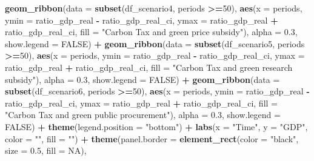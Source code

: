 \documentclass[
]{article}
\newenvironment{Shaded}{\begin{snugshade}}{\end{snugshade}}
\newcommand{\AttributeTok}[1]{\textcolor[rgb]{0.13,0.29,0.53}{#1}}
\newcommand{\ConstantTok}[1]{\textcolor[rgb]{0.56,0.35,0.01}{#1}}
\newcommand{\DecValTok}[1]{\textcolor[rgb]{0.00,0.00,0.81}{#1}}
\newcommand{\FloatTok}[1]{\textcolor[rgb]{0.00,0.00,0.81}{#1}}
\newcommand{\FunctionTok}[1]{\textcolor[rgb]{0.13,0.29,0.53}{\textbf{#1}}}
\newcommand{\NormalTok}[1]{#1}
\newcommand{\SpecialCharTok}[1]{\textcolor[rgb]{0.81,0.36,0.00}{\textbf{#1}}}
\newcommand{\StringTok}[1]{\textcolor[rgb]{0.31,0.60,0.02}{#1}}
\begin{document}
\begin{Shaded}
\begin{Highlighting}[]
  \FunctionTok{geom\_ribbon}\NormalTok{(}\AttributeTok{data =} \FunctionTok{subset}\NormalTok{(df\_scenario4, periods }\SpecialCharTok{\textgreater{}=}\DecValTok{50}\NormalTok{), }\FunctionTok{aes}\NormalTok{(}\AttributeTok{x =}\NormalTok{ periods, }\AttributeTok{ymin =}\NormalTok{ ratio\_gdp\_real }\SpecialCharTok{{-}}\NormalTok{ ratio\_gdp\_real\_ci, }\AttributeTok{ymax =}\NormalTok{ ratio\_gdp\_real }\SpecialCharTok{+}\NormalTok{ ratio\_gdp\_real\_ci, }\AttributeTok{fill =} \StringTok{"Carbon Tax and green price subsidy"}\NormalTok{), }\AttributeTok{alpha =} \FloatTok{0.3}\NormalTok{, }\AttributeTok{show.legend =} \ConstantTok{FALSE}\NormalTok{) }\SpecialCharTok{+}
  \FunctionTok{geom\_ribbon}\NormalTok{(}\AttributeTok{data =} \FunctionTok{subset}\NormalTok{(df\_scenario5, periods }\SpecialCharTok{\textgreater{}=}\DecValTok{50}\NormalTok{), }\FunctionTok{aes}\NormalTok{(}\AttributeTok{x =}\NormalTok{ periods, }\AttributeTok{ymin =}\NormalTok{ ratio\_gdp\_real }\SpecialCharTok{{-}}\NormalTok{ ratio\_gdp\_real\_ci, }\AttributeTok{ymax =}\NormalTok{ ratio\_gdp\_real }\SpecialCharTok{+}\NormalTok{ ratio\_gdp\_real\_ci, }\AttributeTok{fill =} \StringTok{"Carbon Tax and green research subsidy"}\NormalTok{), }\AttributeTok{alpha =} \FloatTok{0.3}\NormalTok{, }\AttributeTok{show.legend =} \ConstantTok{FALSE}\NormalTok{) }\SpecialCharTok{+}
  \FunctionTok{geom\_ribbon}\NormalTok{(}\AttributeTok{data =} \FunctionTok{subset}\NormalTok{(df\_scenario6, periods }\SpecialCharTok{\textgreater{}=}\DecValTok{50}\NormalTok{), }\FunctionTok{aes}\NormalTok{(}\AttributeTok{x =}\NormalTok{ periods, }\AttributeTok{ymin =}\NormalTok{ ratio\_gdp\_real }\SpecialCharTok{{-}}\NormalTok{ ratio\_gdp\_real\_ci, }\AttributeTok{ymax =}\NormalTok{ ratio\_gdp\_real }\SpecialCharTok{+}\NormalTok{ ratio\_gdp\_real\_ci, }\AttributeTok{fill =} \StringTok{"Carbon Tax and green public procurement"}\NormalTok{), }\AttributeTok{alpha =} \FloatTok{0.3}\NormalTok{, }\AttributeTok{show.legend =} \ConstantTok{FALSE}\NormalTok{) }\SpecialCharTok{+}
  \FunctionTok{theme}\NormalTok{(}\AttributeTok{legend.position =} \StringTok{"bottom"}\NormalTok{) }\SpecialCharTok{+}
  \FunctionTok{labs}\NormalTok{(}\AttributeTok{x =} \StringTok{"Time"}\NormalTok{, }\AttributeTok{y =} \StringTok{"GDP"}\NormalTok{, }\AttributeTok{color =} \StringTok{""}\NormalTok{, }\AttributeTok{fill =} \StringTok{""}\NormalTok{) }\SpecialCharTok{+}
  \FunctionTok{theme}\NormalTok{(}\AttributeTok{panel.border =} \FunctionTok{element\_rect}\NormalTok{(}\AttributeTok{color =} \StringTok{"black"}\NormalTok{, }\AttributeTok{size =} \FloatTok{0.5}\NormalTok{, }\AttributeTok{fill =} \ConstantTok{NA}\NormalTok{),}

\end{Highlighting}
\end{Shaded}
\end{document}

